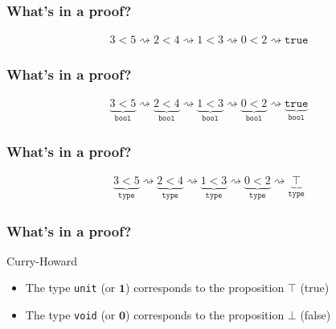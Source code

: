 \documentclass[usenames,dvipsnames]{beamer}
\begin{document}

\begin{frame}
  \frametitle{What's in a proof?}

  \begin{align*}
    3 < 5 \rightsquigarrow 2 < 4 \rightsquigarrow 1 < 3 \rightsquigarrow 0 < 2
    \rightsquigarrow \texttt{true}
  \end{align*}
\end{frame}


\begin{frame}
  \frametitle{What's in a proof?}

  \begin{align*}
    \underbrace{3 < 5}_{\texttt{bool}}
    \rightsquigarrow \underbrace{2 < 4}_{\texttt{bool}}
    \rightsquigarrow \underbrace{1 < 3}_{\texttt{bool}}
    \rightsquigarrow \underbrace{0 < 2}_{\texttt{bool}}
    \rightsquigarrow \underbrace{\texttt{true}}_{\texttt{bool}}
  \end{align*}
\end{frame}


\begin{frame}
  \frametitle{What's in a proof?}

  \begin{align*}
    \underbrace{3 < 5}_{\texttt{type}}
    \rightsquigarrow \underbrace{2 < 4}_{\texttt{type}}
    \rightsquigarrow \underbrace{1 < 3}_{\texttt{type}}
    \rightsquigarrow \underbrace{0 < 2}_{\texttt{type}}
    \rightsquigarrow \underbrace{\top}_{\texttt{type}}
  \end{align*}
\end{frame}


\begin{frame}
  \frametitle{What's in a proof?}

  \begin{block}{Curry-Howard}
    \begin{itemize}
      \item The type \texttt{unit} (or $\mathbf{1}$) corresponds to the
        proposition $\top$ (true)
      \item The type \texttt{void} (or $\mathbf{0}$) corresponds to the
        proposition $\bot$ (false)
    \end{itemize}
  \end{block}
\end{frame}
\end{document}
